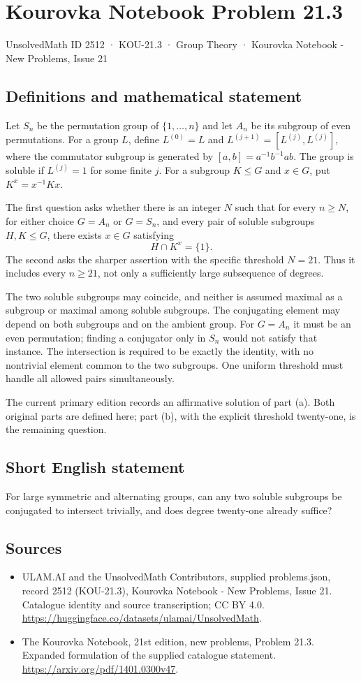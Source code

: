 \documentclass[11pt,a4paper]{article}
\begin{document}
\section*{Kourovka Notebook Problem 21.3}\label{2512}
{\small UnsolvedMath ID 2512 · KOU-21.3 · Group Theory · Kourovka Notebook - New Problems, Issue 21}
\subsection{Definitions and mathematical statement}
Let $S_n$ be the permutation group of $\{1,\ldots,n\}$ and let $A_n$
be its subgroup of even permutations. For a group $L$, define
$L^{(0)}=L$ and $L^{(j+1)}=[L^{(j)},L^{(j)}]$, where the commutator
subgroup is generated by $[a,b]=a^{-1}b^{-1}ab$. The group is soluble
if $L^{(j)}=1$ for some finite $j$.
For a subgroup $K\le G$ and $x\in G$, put $K^x=x^{-1}Kx$.

The first question asks whether there is an integer $N$ such that for
every $n\ge N$, for either choice $G=A_n$ or $G=S_n$, and every pair
of soluble subgroups $H,K\le G$, there exists $x\in G$ satisfying
\[
 H\cap K^x=\{1\}.
\]
The second asks the sharper assertion with the specific threshold
$N=21$. Thus it includes every $n\ge21$, not only a sufficiently large
subsequence of degrees.

The two soluble subgroups may coincide, and neither is assumed maximal
as a subgroup or maximal among soluble subgroups. The conjugating element
may depend on both subgroups and on the ambient group. For $G=A_n$ it
must be an even permutation; finding a conjugator only in $S_n$ would
not satisfy that instance. The intersection is required to be exactly
the identity, with no nontrivial element common to the two subgroups.
One uniform threshold must handle all allowed pairs simultaneously.

The current primary edition records an affirmative solution of part (a).
Both original parts are defined here; part (b), with the explicit
threshold twenty-one, is the remaining question.
\subsection{Short English statement}
For large symmetric and alternating groups, can any two soluble subgroups be conjugated to intersect trivially, and does degree twenty-one already suffice?
\subsection{Sources}
\begin{itemize}
\item[S1] ULAM.AI and the UnsolvedMath Contributors, supplied problems.json, record 2512 (KOU-21.3), Kourovka Notebook - New Problems, Issue 21. Catalogue identity and source transcription; CC BY 4.0.
\url{https://huggingface.co/datasets/ulamai/UnsolvedMath}.
\item[S2] The Kourovka Notebook, 21st edition, new problems, Problem 21.3. Expanded formulation of the supplied catalogue statement.
\url{https://arxiv.org/pdf/1401.0300v47}.
\end{itemize}
\end{document}
